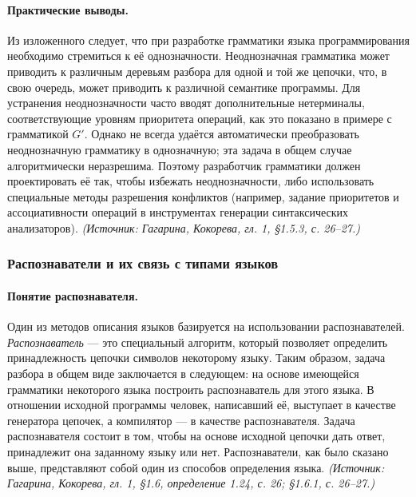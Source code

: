 \documentclass[a4paper,12pt]{article}
\begin{document}
\paragraph{Практические выводы.}
Из изложенного следует, что при разработке грамматики языка программирования необходимо стремиться к её однозначности. Неоднозначная грамматика может приводить к различным деревьям разбора для одной и той же цепочки, что, в свою очередь, может приводить к различной семантике программы. Для устранения неоднозначности часто вводят дополнительные нетерминалы, соответствующие уровням приоритета операций, как это показано в примере с грамматикой \(G'\). Однако не всегда удаётся автоматически преобразовать неоднозначную грамматику в однозначную; эта задача в общем случае алгоритмически неразрешима. Поэтому разработчик грамматики должен проектировать её так, чтобы избежать неоднозначности, либо использовать специальные методы разрешения конфликтов (например, задание приоритетов и ассоциативности операций в инструментах генерации синтаксических анализаторов).
\textit{(Источник: Гагарина, Кокорева, гл. 1, §1.5.3, с. 26--27.)}

\subsubsection{Распознаватели и их связь с типами языков}

\paragraph{Понятие распознавателя.}
Один из методов описания языков базируется на использовании распознавателей. \emph{Распознаватель} — это специальный алгоритм, который позволяет определить принадлежность цепочки символов некоторому языку. Таким образом, задача разбора в общем виде заключается в следующем: на основе имеющейся грамматики некоторого языка построить распознаватель для этого языка. В отношении исходной программы человек, написавший её, выступает в качестве генератора цепочек, а компилятор — в качестве распознавателя. Задача распознавателя состоит в том, чтобы на основе исходной цепочки дать ответ, принадлежит она заданному языку или нет. Распознаватели, как было сказано выше, представляют собой один из способов определения языка.
\textit{(Источник: Гагарина, Кокорева, гл. 1, §1.6, определение 1.24, с. 26; §1.6.1, с. 26--27.)}
\end{document}
